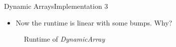 
\begin{frame}{Dynamic Arrays}{Implementation 3}
  \begin{itemize}
    \item
      Now the runtime is linear with some bumps. Why?
  \end{itemize}
  \begin{figure}
    
    \vspace{-1.0em}
    \caption{Runtime of \textit{DynamicArray}}
    \label{fig:runtime_dynamic_array_impl3}
  \end{figure}
\end{frame}


